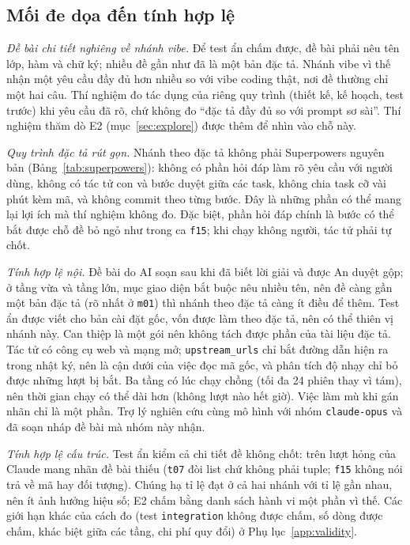 \subsection{Mối đe dọa đến tính hợp lệ}\label{sec:threats}

\textit{Đề bài chi tiết nghiêng về nhánh vibe.} Để test ẩn chấm được, đề bài phải nêu tên lớp, hàm và chữ
ký; nhiều đề gần như đã là một bản đặc tả. Nhánh vibe vì thế nhận một yêu cầu đầy đủ hơn nhiều so với vibe
coding thật, nơi đề thường chỉ một hai câu. Thí nghiệm đo tác dụng của riêng quy trình (thiết kế, kế hoạch,
test trước) khi yêu cầu đã rõ, chứ không đo ``đặc tả đầy đủ so với prompt sơ sài''. Thí nghiệm thăm dò E2
(mục~\ref{sec:explore}) được thêm để nhìn vào chỗ này.

\textit{Quy trình đặc tả rút gọn.} Nhánh theo đặc tả không phải Superpowers nguyên bản
(Bảng~\ref{tab:superpowers}): không có phần hỏi đáp làm rõ yêu cầu với người dùng, không có tác tử con và
bước duyệt giữa các task, không chia task cỡ vài phút kèm mã, và không commit theo từng bước. Đây là những
phần có thể mang lại lợi ích mà thí nghiệm không đo. Đặc biệt, phần hỏi đáp chính là bước có thể bắt được
chỗ đề bỏ ngỏ như trong ca \texttt{f15}; khi chạy không người, tác tử phải tự chốt.

\textit{Tính hợp lệ nội.} Đề bài do AI soạn sau khi đã biết lời giải và được An duyệt gộp; ở tầng vừa và
tầng lớn, mục giao diện bắt buộc nêu nhiều tên, nên đề càng gần một bản đặc tả (rõ nhất ở
\texttt{m01}) thì nhánh theo đặc tả càng ít điều để thêm. Test ẩn được viết cho bản cài đặt gốc, vốn được
làm theo đặc tả, nên có thể thiên vị nhánh này. Can thiệp là một gói nên không tách được phần của tài liệu đặc tả. Tác tử có công cụ web và mạng mở;
\texttt{upstream\_urls} chỉ bắt đường dẫn hiện ra trong nhật ký, nên là cận dưới của việc đọc mã gốc, và
phân tích độ nhạy chỉ bỏ được những lượt bị bắt. Ba tầng có lúc chạy chồng (tối đa 24 phiên thay vì tám),
nên thời gian chạy có thể dài hơn (không lượt nào hết giờ). Việc làm mù khi gán nhãn
chỉ là một phần. Trợ lý nghiên cứu cùng mô hình với nhóm \texttt{claude-opus} và đã soạn nháp đề bài mà nhóm
này nhận.

\textit{Tính hợp lệ cấu trúc.} Test ẩn kiểm cả chi tiết đề không chốt: \NumLabDeBaiThieuTotal{} trên
\NumLabRuns{} lượt hỏng của Claude mang nhãn đề bài thiếu (\texttt{t07} đòi list chứ không phải tuple;
\texttt{f15} không nói trả về mã hay đối tượng). Chúng hạ tỉ lệ đạt ở cả hai nhánh với tỉ lệ gần nhau, nên
ít ảnh hưởng hiệu số; E2 chấm bằng danh sách hành vi một phần vì thế. Các giới hạn khác của cách đo (test \texttt{integration} không được chấm, số dòng được
chấm, khác biệt giữa các tầng, chi phí quy đổi) ở Phụ lục~\ref{app:validity}.

